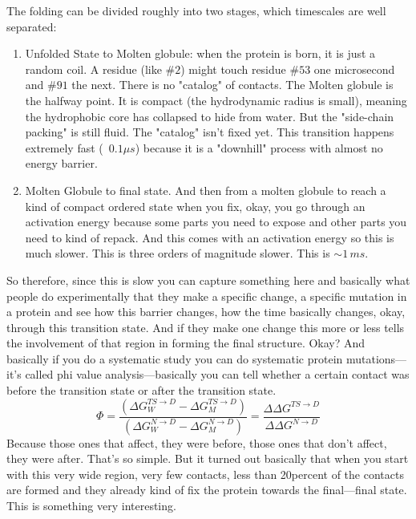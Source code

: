 The folding can be divided roughly into two stages, which timescales are well separated:

\begin{enumerate}
    \item Unfolded State to Molten globule: when the protein is born, it is just a random coil. A residue (like $\#2$) might touch residue $\#53$ one microsecond and $\#91$ the next. There is no "catalog" of contacts. The Molten globule is the halfway point. It is compact (the hydrodynamic radius is small), meaning the hydrophobic core has collapsed to hide from water. But the "side-chain packing" is still fluid. The "catalog" isn't fixed yet. This transition happens extremely fast (~$0.1\mu s$) because it is a "downhill" process with almost no energy barrier.
    \item  Molten Globule to final state. And then from a molten globule to reach a kind of compact ordered state when you fix, okay, you go through an activation energy because some parts you need to expose and other parts you need to kind of repack. And this comes with an activation energy so this is much slower. This is three orders of magnitude slower. This is $\sim 1\, ms$.
\end{enumerate}
So therefore, since this is slow you can capture something here and basically what people do experimentally that they make a specific change, a specific mutation in a protein and see how this barrier changes, how the time basically changes, okay, through this transition state. And if they make one change this more or less tells the involvement of that region in forming the final structure. Okay? And basically if you do a systematic study you can do systematic protein mutations—it’s called phi value analysis—basically you can tell whether a certain contact was before the transition state or after the transition state.
$$
 \Phi ={\frac {(\Delta G_{W}^{TS\rightarrow D}-\Delta G_{M}^{TS\rightarrow D})}{(\Delta G_{W}^{N\rightarrow D}-\Delta G_{M}^{N\rightarrow D})}}={\frac {\Delta \Delta G^{TS\rightarrow D}}{\Delta \Delta G^{N\rightarrow D}}}
$$
Because those ones that affect, they were before, those ones that don’t affect, they were after. That’s so simple. But it turned out basically that when you start with this very wide region, very few contacts, less than 20percent of the contacts are formed and they already kind of fix the protein towards the final—final state. This is something very interesting. 

